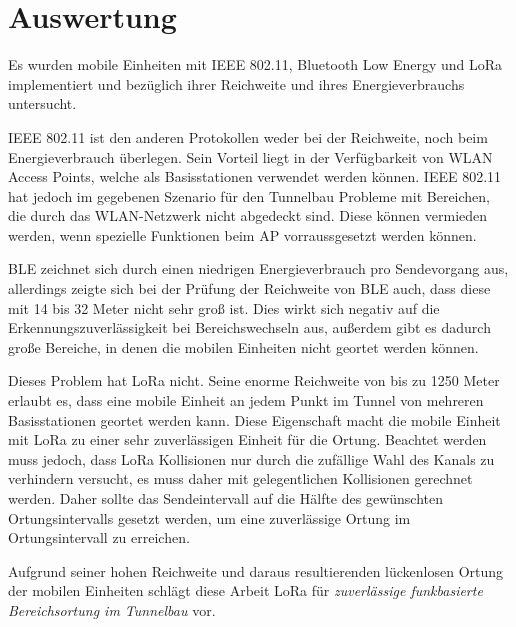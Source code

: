 \section{Auswertung}
Es wurden mobile Einheiten mit IEEE 802.11, Bluetooth Low Energy und LoRa implementiert und bezüglich ihrer Reichweite und ihres Energieverbrauchs untersucht.

IEEE 802.11 ist den anderen Protokollen weder bei der Reichweite, noch beim Energieverbrauch überlegen. 
Sein Vorteil liegt in der Verfügbarkeit von WLAN Access Points, welche als Basisstationen verwendet werden können.
IEEE 802.11 hat jedoch im gegebenen Szenario für den Tunnelbau Probleme mit Bereichen, die durch das WLAN-Netzwerk nicht abgedeckt sind. 
Diese können vermieden werden, wenn spezielle Funktionen beim AP vorraussgesetzt werden können.

BLE zeichnet sich durch einen niedrigen Energieverbrauch pro Sendevorgang aus, allerdings zeigte sich bei der Prüfung der Reichweite von BLE auch, dass diese mit 14 bis 32 Meter nicht sehr groß ist.
Dies wirkt sich negativ auf die Erkennungszuverlässigkeit bei Bereichswechseln aus, außerdem gibt es dadurch große Bereiche, in denen die mobilen Einheiten nicht geortet werden können.

Dieses Problem hat LoRa nicht. 
Seine enorme Reichweite von bis zu 1250 Meter erlaubt es, dass eine mobile Einheit an jedem Punkt im Tunnel von mehreren Basisstationen geortet werden kann.
Diese Eigenschaft macht die mobile Einheit mit LoRa zu einer sehr zuverlässigen Einheit für die Ortung.
Beachtet werden muss jedoch, dass LoRa Kollisionen nur durch die zufällige Wahl des Kanals zu verhindern versucht, es muss daher mit gelegentlichen Kollisionen gerechnet werden.
Daher sollte das Sendeintervall auf die Hälfte des gewünschten Ortungsintervalls gesetzt werden, um eine zuverlässige Ortung im Ortungsintervall zu erreichen.

Aufgrund seiner hohen Reichweite und daraus resultierenden lückenlosen Ortung der mobilen Einheiten schlägt diese Arbeit LoRa für \emph{zuverlässige funkbasierte Bereichsortung im Tunnelbau} vor.





